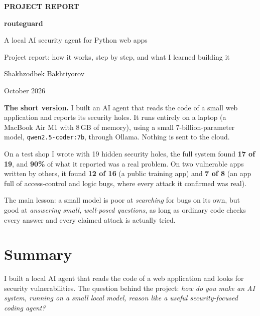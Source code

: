 \documentclass[11pt,a4paper]{article}
\newcommand{\code}[1]{\texttt{#1}}
\begin{document}
\begin{titlepage}
\vspace*{2.5cm}
{\small\color{accent}\textbf{PROJECT REPORT}}\par
\vspace{0.6cm}
{\Huge\bfseries\color{ink} routeguard\par}
\vspace{0.3cm}
{\LARGE\color{ink} A local AI security agent for Python web apps\par}
\vspace{0.8cm}
{\large\color{grey} Project report: how it works, step by step, and what I learned building it\par}
\vspace{2cm}
{\large Shakhzodbek Bakhtiyorov\par}
{\color{grey} October 2026\par}
\vfill
\begin{tcolorbox}[colback=soft,colframe=accent,boxrule=0.6pt,arc=2mm]
\textbf{The short version.} I built an AI agent that reads the code of a small web application and
reports its security holes. It runs entirely on a laptop (a MacBook Air M1 with 8\,GB of memory),
using a small 7-billion-parameter model, \code{qwen2.5-coder:7b}, through Ollama. Nothing is sent
to the cloud.

On a test shop I wrote with 19 hidden security holes, the full system found \textbf{17 of 19}, and
\textbf{90\%} of what it reported was a real problem. On two vulnerable apps written by others, it found
\textbf{12 of 16} (a public training app) and \textbf{7 of 8} (an app full of access-control and logic bugs,
where every attack it confirmed was real).

The main lesson: a small model is poor at \emph{searching} for bugs on its own, but good at
\emph{answering small, well-posed questions}, as long as ordinary code checks every answer
and every claimed attack is actually tried.
\end{tcolorbox}
\end{titlepage}

\tableofcontents
\newpage

\section{Summary}

I built a local AI agent that reads the code of a web application and looks for security vulnerabilities.
The question behind the project: \emph{how do you make an AI system, running on a small local model,
reason like a useful security-focused coding agent?}
\end{document}
